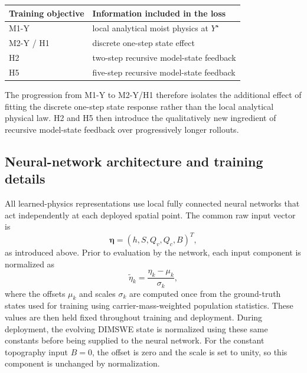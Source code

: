 \documentclass[12pt]{article}
\begin{document}
\begin{center}
	\begin{tabular}{l|l}
		Training objective & Information included in the loss \\
		\hline
		M1-Y & local analytical moist physics at $Y^\star$ \\
		M2-Y / H1 & discrete one-step state effect \\
		H2 & two-step recursive model-state feedback \\
		H5 & five-step recursive model-state feedback
	\end{tabular}
\end{center}

The progression from M1-Y to M2-Y/H1 therefore isolates the additional effect
of fitting the discrete one-step state response rather than the local
analytical physical law. H2 and H5 then introduce the qualitatively new
ingredient of recursive model-state feedback over progressively longer
rollouts.

\subsection{Neural-network architecture and training details}\label{sec:TrainDetail}

All learned-physics representations use local fully connected neural networks
that act independently at each deployed spatial point. The common raw input
vector is
\begin{equation}
	\boldsymbol{\eta}
	=
	\left(h,S,Q_v,Q_c,B\right)^T,
\end{equation}
as introduced above. Prior to evaluation by the network, each input component
is normalized as
\begin{equation}
	\widetilde{\eta}_k
	=
	\frac{\eta_k-\mu_k}{\sigma_k},
	\label{eq:input_normalization}
\end{equation}
where the offsets $\mu_k$ and scales $\sigma_k$ are computed once from the
ground-truth states used for training using carrier-mass-weighted population
statistics. These values are then held fixed throughout training and
deployment. During deployment, the evolving DIMSWE state is normalized using
these same constants before being supplied to the neural network. For the
constant topography input $B=0$, the offset is zero and the scale is set to
unity, so this component is unchanged by normalization.
\end{document}
